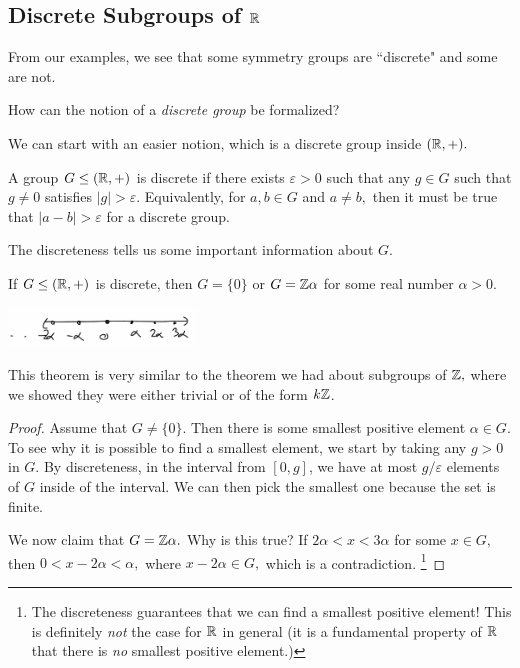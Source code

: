\subsection{Discrete Subgroups of \texorpdfstring{$\mathbb R$}{R}}
From our examples, we see that some symmetry groups are ``discrete" and some are not.
\begin{qq}
How can the notion of a \emph{discrete group} be formalized?
\end{qq}
We can start with an easier notion, which is a discrete group inside $(\mathbb R, +).$
\begin{definition}
A group $G \leq (\mathbb R, +)$ is discrete if there exists $\varepsilon > 0$ such that any $g \in G$ such that $g \neq 0$ satisfies $|g| > \varepsilon.$ Equivalently, for $a, b \in G$ and $a \neq b,$ then it must be true that $|a-b| > \varepsilon$ for a discrete group. 
\end{definition}

The discreteness tells us some important information about $G.$
\begin{theorem}\label{discrete subgroups of r}
If $G \leq (\mathbb R, +)$ is discrete, then $G = \{0\}$ or $G = \mathbb Z \alpha$ for some real number $\alpha > 0.$ 
\begin{center}
    \includegraphics[width=5cm]{Lecture Files and Images/lec14-disc.png}
\end{center} %
\end{theorem}
This theorem is very similar to the theorem we had about subgroups of $\mathbb Z,$ where we showed they were either trivial or of the form $k\mathbb Z$.
\begin{proof}
Assume that $G \neq \{0\}.$ Then there is some smallest positive element $\alpha \in G.$ 
To see why it is possible to find a smallest element, we start by taking any $g > 0$ in $G$. 
By discreteness, in the interval from $[0, g]$, we have at most $g/\varepsilon$ elements of $G$ inside of the interval. 
We can then pick the smallest one because the set is finite.

We now claim that $G = \mathbb Z \alpha.$ Why is this true? If $2\alpha < x < 3\alpha$ for some $x \in G,$ then $0 < x-2\alpha < \alpha,$ where $x-2\alpha \in G,$ which is a contradiction.
\footnote{The discreteness guarantees that we can find a smallest positive element! This is definitely \emph{not} the case for $\mathbb R$ in general (it is a fundamental property of $\mathbb R$ that there is \emph{no} smallest positive element.)}
\end{proof}

